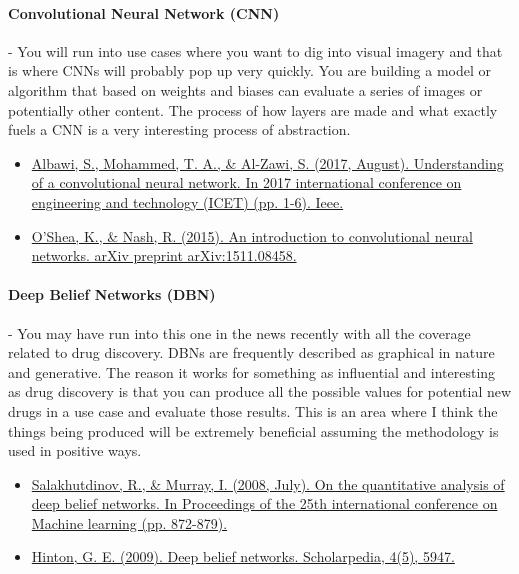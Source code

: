 \documentclass{article}
\begin{document}
\paragraph{Convolutional Neural Network (CNN)} - You will run into use cases where you want to dig into visual imagery and that is where CNNs will probably pop up very quickly. You are building a model or algorithm that based on weights and biases can evaluate a series of images or potentially other content. The process of how layers are made and what exactly fuels a CNN is a very interesting process of abstraction. 

\begin{itemize}
\item \href{https://www.ncbi.nlm.nih.gov/pmc/articles/PMC6197001/pdf/CIN2018-6973103.pdf}{Albawi, S., Mohammed, T. A., \& Al-Zawi, S. (2017, August). Understanding of a convolutional neural network. In 2017 international conference on engineering and technology (ICET) (pp. 1-6). Ieee.} \cite{albawi2017understanding}
\item \href{https://arxiv.org/pdf/1511.08458}{O'Shea, K., \& Nash, R. (2015). An introduction to convolutional neural networks. arXiv preprint arXiv:1511.08458.} \cite{o2015introduction}
\end{itemize}

\paragraph{Deep Belief Networks (DBN)} - You may have run into this one in the news recently with all the coverage related to drug discovery. DBNs are frequently described as graphical in nature and generative. The reason it works for something as influential and interesting as drug discovery is that you can produce all the possible values for potential new drugs in a use case and evaluate those results. This is an area where I think the things being produced will be extremely beneficial assuming the methodology is used in positive ways. 

\begin{itemize}
\item \href{https://era.ed.ac.uk/bitstream/handle/1842/4588/MurrayI_On the Quantitative Analysis.pdf?sequence=1&isAllowed=y}{Salakhutdinov, R., \& Murray, I. (2008, July). On the quantitative analysis of deep belief networks. In Proceedings of the 25th international conference on Machine learning (pp. 872-879).} \cite{salakhutdinov2008quantitative}
\item \href{http://scholarpedia.org/article/Deep_belief_networks}{Hinton, G. E. (2009). Deep belief networks. Scholarpedia, 4(5), 5947.} \cite{hinton2009deep} 
\end{itemize}
\end{document}

